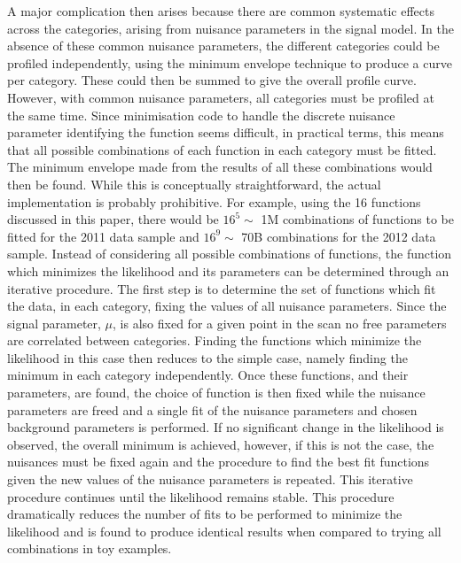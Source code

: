 A major complication then arises because there are common systematic effects
across the categories, arising from nuisance parameters in the signal
model.
In the absence of these common nuisance parameters,
the different categories could be profiled independently, using the
minimum envelope technique to produce a curve per category. These could then
be summed to give the overall profile curve. However, with common
nuisance parameters, all categories must be profiled at the same time.
Since minimisation code to handle the 
discrete nuisance parameter identifying the
function seems difficult, in practical terms, this means that all possible
combinations of each function in each category must be fitted.
The minimum envelope made from the results of all these combinations would
then be found. While this is conceptually straightforward, the actual
implementation is probably prohibitive. For example, using the 16 functions
discussed in this paper, there would be $16^5 \sim$ 1M combinations of functions
to be fitted for the 2011 data sample and $16^9 \sim$ 70B combinations for the
2012 data sample.
Instead of considering all possible combinations of functions, the function 
which minimizes the likelihood and its parameters can be determined through 
an iterative procedure. The first step is to determine the set of functions which 
fit the data, in each category, fixing the values of all nuisance parameters. Since 
the signal parameter, $\mu$, is also fixed for a given point in the scan no free parameters 
are correlated between categories. Finding the functions which minimize the likelihood in 
this case then reduces to the simple case, namely finding the minimum in each category 
independently. Once these functions, and their parameters, are found, the choice of function 
is then fixed while the nuisance parameters are freed and a single fit of the nuisance parameters 
and chosen background parameters is performed. If no significant change in the likelihood 
is observed, the overall minimum is achieved, however, if this is not the case, the 
nuisances must be fixed again and the procedure to find the best fit functions given the 
new values of the nuisance parameters is repeated. This iterative procedure continues until the 
likelihood remains stable. This procedure dramatically reduces the number of fits to be performed 
to minimize the likelihood and is found to produce identical results when compared to trying 
all combinations in toy examples. 






